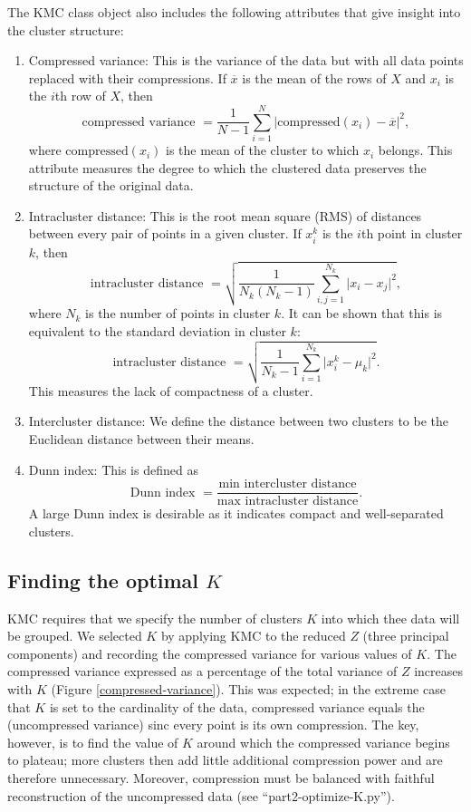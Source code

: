 \documentclass[12pt]{article}
\begin{document}
The KMC class object also includes the following attributes that give insight into the cluster structure:
\begin{enumerate}
\item Compressed variance: This is the variance of the data but with all data points replaced with their compressions. If $\overline{x}$ is the mean of the rows of $X$ and $x_i$ is the $i$th row of $X$, then
\[ \mbox{compressed variance } = \frac{1}{N-1}\sum_{i=1}^N \lvert \mbox{compressed}(x_i)-\overline{x}\rvert^2, \]
where $\mbox{compressed}(x_i)$ is the mean of the cluster to which $x_i$ belongs. This attribute measures the degree to which the clustered data preserves the structure of the original data.
\item Intracluster distance: This is the root mean square (RMS) of distances between every pair of points in a given cluster. If $x_i^k$ is the $i$th point in cluster $k$, then
\[ \mbox{intracluster distance } = \sqrt{\frac{1}{N_k(N_k-1)}\sum_{i,j=1}^{N_k}\lvert x_i-x_j\rvert^2}, \]
where $N_k$ is the number of points in cluster $k$. It can be shown that this is equivalent to the standard deviation in cluster $k$:
\[ \mbox{intracluster distance } = \sqrt{\frac{1}{N_k-1}\sum_{i=1}^{N_k}\lvert x_i^k-\mu_k\rvert^2}. \]
This measures the lack of compactness of a cluster.
\item Intercluster distance: We define the distance between two clusters to be the Euclidean distance between their means.
\item Dunn index: This is defined as
\[ \mbox{Dunn index } = \frac{\mbox{min intercluster distance}}{\mbox{max intracluster distance}}. \]
A large Dunn index is desirable as it indicates compact and well-separated clusters.
\end{enumerate}

\subsection{Finding the optimal $K$}

KMC requires that we specify the number of clusters $K$ into which thee data will be grouped. We selected $K$ by applying KMC to the reduced $Z$ (three principal components) and recording the compressed variance for various values of $K$. The compressed variance expressed as a percentage of the total variance of $Z$ increases with $K$ (Figure \ref{compressed-variance}). This was expected; in the extreme case that $K$ is set to the cardinality of the data, compressed variance equals the (uncompressed variance) sinc every point is its own compression. The key, however, is to find the value of $K$ around which the compressed variance begins to plateau; more clusters then add little additional compression power and are therefore unnecessary. Moreover, compression must be balanced with faithful reconstruction of the uncompressed data (see ``part2-optimize-K.py'').
\end{document}

